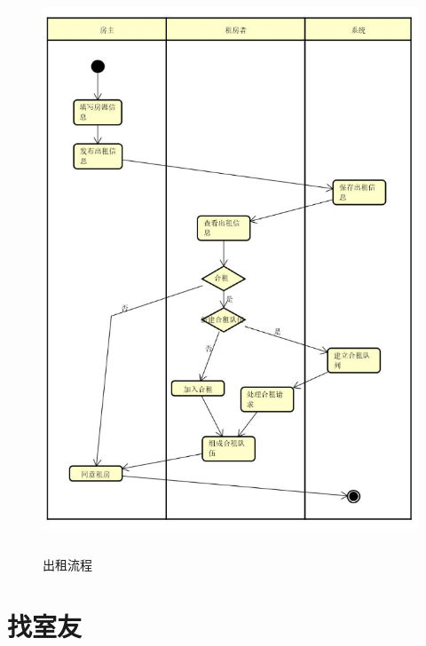 \begin{figure}[htbp]

    \centering
    
    \includegraphics[height=17.0cm,width=14.0cm]{requirement/figures/chuzu.png} 
    \caption{出租流程}
    
    \end{figure}
    \newpage
\section{找室友}

